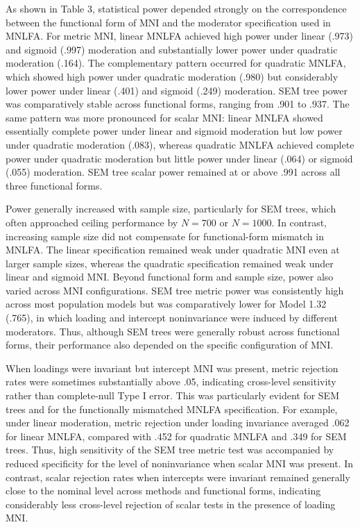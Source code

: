 \documentclass[
  man,
  floatsintext]{apa7}
\begin{document}
As shown in Table 3, statistical power depended strongly on the
correspondence between the functional form of MNI and the moderator
specification used in MNLFA. For metric MNI, linear MNLFA achieved high
power under linear (.973) and sigmoid (.997) moderation and
substantially lower power under quadratic moderation (.164). The
complementary pattern occurred for quadratic MNLFA, which showed high
power under quadratic moderation (.980) but considerably lower power
under linear (.401) and sigmoid (.249) moderation. SEM tree power was
comparatively stable across functional forms, ranging from .901 to .937.
The same pattern was more pronounced for scalar MNI: linear MNLFA showed
essentially complete power under linear and sigmoid moderation but low
power under quadratic moderation (.083), whereas quadratic MNLFA
achieved complete power under quadratic moderation but little power
under linear (.064) or sigmoid (.055) moderation. SEM tree scalar power
remained at or above .991 across all three functional forms.

Power generally increased with sample size, particularly for SEM trees,
which often approached ceiling performance by \(N=700\) or \(N=1000\).
In contrast, increasing sample size did not compensate for
functional-form mismatch in MNLFA. The linear specification remained
weak under quadratic MNI even at larger sample sizes, whereas the
quadratic specification remained weak under linear and sigmoid MNI.
Beyond functional form and sample size, power also varied across MNI
configurations. SEM tree metric power was consistently high across most
population models but was comparatively lower for Model 1.32 (.765), in
which loading and intercept noninvariance were induced by different
moderators. Thus, although SEM trees were generally robust across
functional forms, their performance also depended on the specific
configuration of MNI.

When loadings were invariant but intercept MNI was present, metric
rejection rates were sometimes substantially above .05, indicating
cross-level sensitivity rather than complete-null Type I error. This was
particularly evident for SEM trees and for the functionally mismatched
MNLFA specification. For example, under linear moderation, metric
rejection under loading invariance averaged .062 for linear MNLFA,
compared with .452 for quadratic MNLFA and .349 for SEM trees. Thus,
high sensitivity of the SEM tree metric test was accompanied by reduced
specificity for the level of noninvariance when scalar MNI was present.
In contrast, scalar rejection rates when intercepts were invariant
remained generally close to the nominal level across methods and
functional forms, indicating considerably less cross-level rejection of
scalar tests in the presence of loading MNI.
\end{document}
